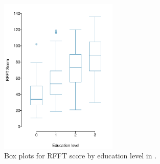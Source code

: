 \begin{figure}[h!]
	\centering
	\includegraphics[width=0.5\textwidth]
	{ch_multiple_linear_regression_oi_biostat/figures/prevendRFFTEducBoxPlot/prevendRFFTEducBoxPlot.pdf}
	\caption{Box plots for RFFT score by education level in .}
	\label{prevendRFFTEducBoxPlot}
\end{figure}

